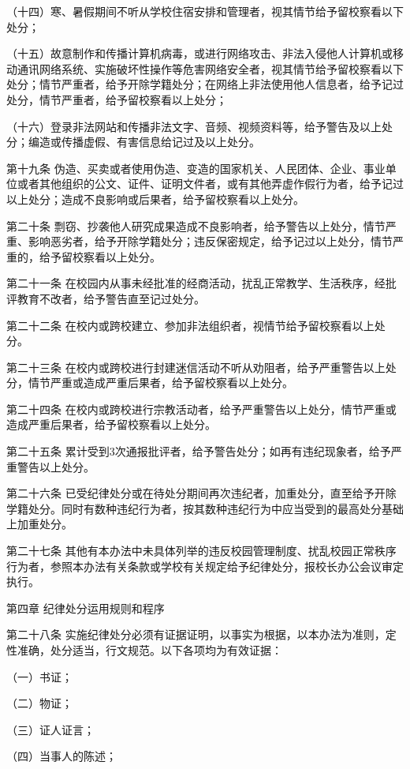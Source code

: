 \documentclass[UTF8,12pt,a4paper]{report}
\begin{document}
（十四）寒、暑假期间不听从学校住宿安排和管理者，视其情节给予留校察看以下处分；

（十五）故意制作和传播计算机病毒，或进行网络攻击、非法入侵他人计算机或移动通讯网络系统、实施破坏性操作等危害网络安全者，视其情节给予留校察看以下处分；情节严重者，给予开除学籍处分；在网络上非法使用他人信息者，给予记过处分，情节严重者，给予留校察看以上处分；

（十六）登录非法网站和传播非法文字、音频、视频资料等，给予警告及以上处分；编造或传播虚假、有害信息给记过及以上处分。

第十九条  伪造、买卖或者使用伪造、变造的国家机关、人民团体、企业、事业单位或者其他组织的公文、证件、证明文件者，或有其他弄虚作假行为者，给予记过以上处分；造成不良影响或后果者，给予留校察看以上处分。

第二十条  剽窃、抄袭他人研究成果造成不良影响者，给予警告以上处分，情节严重、影响恶劣者，给予开除学籍处分；违反保密规定，给予记过以上处分，情节严重的，给予留校察看以上处分。

第二十一条  在校园内从事未经批准的经商活动，扰乱正常教学、生活秩序，经批评教育不改者，给予警告直至记过处分。

第二十二条  在校内或跨校建立、参加非法组织者，视情节给予留校察看以上处分。

第二十三条  在校内或跨校进行封建迷信活动不听从劝阻者，给予严重警告以上处分，情节严重或造成严重后果者，给予留校察看以上处分。

第二十四条  在校内或跨校进行宗教活动者，给予严重警告以上处分，情节严重或造成严重后果者，给予留校察看以上处分。

第二十五条  累计受到3次通报批评者，给予警告处分；如再有违纪现象者，给予严重警告以上处分。

第二十六条  已受纪律处分或在待处分期间再次违纪者，加重处分，直至给予开除学籍处分。同时有数种违纪行为者，按其数种违纪行为中应当受到的最高处分基础上加重处分。

第二十七条  其他有本办法中未具体列举的违反校园管理制度、扰乱校园正常秩序行为者，参照本办法有关条款或学校有关规定给予纪律处分，报校长办公会议审定执行。



第四章  纪律处分运用规则和程序

第二十八条  实施纪律处分必须有证据证明，以事实为根据，以本办法为准则，定性准确，处分适当，行文规范。以下各项均为有效证据：

（一）书证；

（二）物证；

（三）证人证言； 

（四）当事人的陈述；
\end{document}
